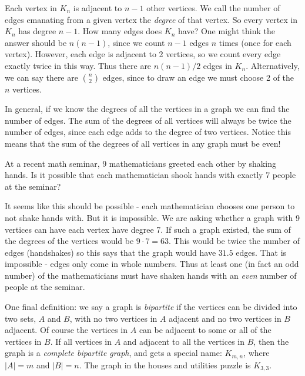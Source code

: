\documentclass[12pt]{article}
\begin{document}
Each vertex in $K_n$ is adjacent to $n-1$ other vertices.  We call the number of edges emanating from a given vertex the {\em degree} of that vertex.  So every vertex in $K_n$ has degree $n-1$.  How many edges does $K_n$ have?  One might think the answer should be $n(n-1)$, since we count $n-1$ edges $n$ times (once for each vertex).  However, each edge is adjacent to 2 vertices, so we count every edge exactly twice in this way.  Thus there are $n(n-1)/2$ edges in $K_n$.  
Alternatively, we can say there are ${n \choose 2}$ edges, since to draw an edge we must choose 2 of the $n$ vertices.

In general, if we know the degrees of all the vertices in a graph we can find the number of edges.  The sum of the degrees of all vertices will always be twice the number of edges, since each edge adds to the degree of two vertices.  Notice this means that the sum of the degrees of all vertices in any graph must be even!

\begin{example}
  At a recent math seminar, 9 mathematicians greeted each other by shaking hands.  Is it possible that each mathematician shook hands with exactly 7 people at the seminar?
  \begin{solution}
    It seems like this should be possible - each mathematician chooses one person to not shake hands with.  But it is impossible.  We are asking whether a graph with 9 vertices can have each vertex have degree 7.  If such a graph existed, the sum of the degrees of the vertices would be $9\cdot 7 = 63$.  This would be twice the number of edges (handshakes) so this says that the graph would have $31.5$ edges.  That is impossible - edges only come in whole numbers.  Thus at least one (in fact an odd number) of the mathematicians must have shaken hands with an {\em even} number of people at the seminar.
  \end{solution}

\end{example}

One final definition: we say a graph is {\em bipartite} if the vertices can be divided into two sets, $A$ and $B$, with no two vertices in $A$ adjacent and no two vertices in $B$ adjacent.  Of course the vertices in $A$ can be adjacent to some or all of the vertices in $B$.  If all vertices in $A$ and adjacent to all the vertices in $B$, then the graph is a {\em complete bipartite graph}, and gets a special name: $K_{m,n}$, where $|A| = m$ and $|B| = n$.  The graph in the houses and utilities puzzle is $K_{3,3}$.
\end{document}

